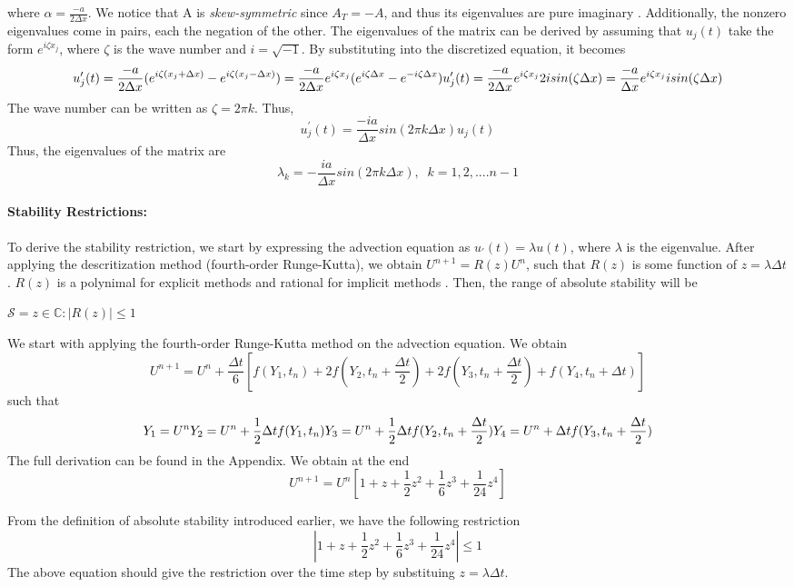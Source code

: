 where $\alpha = \frac{-a}{2\Delta x}$. We notice that A is \emph{skew-symmetric} since $A_{T}=-A$, and thus its eigenvalues are pure imaginary \cite{leveque2007finite}. Additionally, the nonzero eigenvalues come in pairs, each the negation of the other. 
The eigenvalues of the matrix can be derived by assuming that $u_{j}(t)$ take the form $e^{i\zeta x_{j}}$, where $\zeta$ is the wave number and $i=\sqrt{-1}$. By substituting into the discretized equation, it becomes 
$$
u_{j}^{\prime}(t) = \frac{-a}{2\Delta x}(e^{i\zeta (x_{j}+\Delta x)}-e^{i\zeta (x_{j}-\Delta x)}) = \frac{-a}{2\Delta x}e^{i\zeta x_{j}}(e^{i\zeta \Delta x}-e^{-i\zeta \Delta x})
\\
u_{j}^{\prime}(t) = \frac{-a}{2\Delta x}e^{i\zeta x_{j}}2isin(\zeta \Delta x)=\frac{-a}{\Delta x}e^{i\zeta x_{j}}isin(\zeta \Delta x)
$$
The wave number can be written as $\zeta=2\pi k$. Thus,
$$
u_{j}^{\prime}(t) = \frac{-ia}{\Delta x}sin(2\pi k \Delta x)u_{j}(t)
$$
Thus, the eigenvalues of the matrix are
$$
\lambda_{k} = -\frac{ia}{\Delta x}sin(2\pi k \Delta x), \;\; k=1,2,.... n-1
$$


\paragraph{Stability Restrictions:}
To derive the stability restriction, we start by expressing the advection equation as $u_{\prime}(t)=\lambda u(t)$, where $\lambda$ is the eigenvalue. After applying the descritization method (fourth-order Runge-Kutta), we obtain $U^{n+1}=R(z)U^{n}$, such that $R(z)$ is some function of $z=\lambda\Delta t$. $R(z)$ is a polynimal for explicit methods and rational for implicit methods \cite{leveque2007finite}. Then, the range of absolute stability will be 

$\mathcal{S}={z\in \mathbb{C} : |R(z)|\leq 1}$

We start with applying the fourth-order Runge-Kutta method on the advection equation. We obtain
$$
U^{n+1} = U^{n} + \frac{\Delta t}{6}[f(Y_{1},t_{n})+2f(Y_{2},t_{n}+\frac{\Delta t}{2})+2f(Y_{3},t_{n}+\frac{\Delta t}{2})+f(Y_{4},t_{n}+\Delta t)]
$$
such that 
$$
Y_{1}=U^{n}
\\
Y_{2}=U^{n}+\frac{1}{2}\Delta t f(Y_{1},t_{n})
\\
Y_{3}=U^{n}+\frac{1}{2}\Delta t f(Y_{2},t_{n}+\frac{\Delta t}{2})
\\
Y_{4}=U^{n}+\Delta t f(Y_{3},t_{n}+\frac{\Delta t}{2})
$$
The full derivation can be found in the Appendix. We obtain at the end 
$$
U^{n+1} = U^{n}[1+z+\frac{1}{2}z^{2}+\frac{1}{6}z^{3}+\frac{1}{24}z^{4}]
$$ 

From the definition of absolute stability introduced earlier, we have the following restriction 
$$
|1+z+\frac{1}{2}z^{2}+\frac{1}{6}z^{3}+\frac{1}{24}z^{4}| \leq 1
$$
The above equation should give the restriction over the time step by substituing $z=\lambda \Delta t$. 

